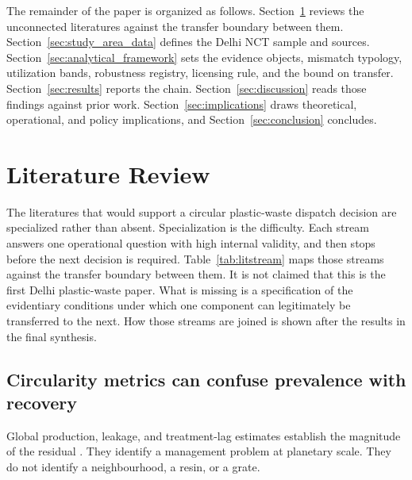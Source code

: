 \documentclass[12pt,a4paper]{article}
\begin{document}
The remainder of the paper is organized as follows. Section~\ref{sec:literature} reviews the unconnected literatures against the transfer boundary between them. Section~\ref{sec:study_area_data} defines the Delhi NCT sample and sources. Section~\ref{sec:analytical_framework} sets the evidence objects, mismatch typology, utilization bands, robustness registry, licensing rule, and the bound on transfer. Section~\ref{sec:results} reports the chain. Section~\ref{sec:discussion} reads those findings against prior work. Section~\ref{sec:implications} draws theoretical, operational, and policy implications, and Section~\ref{sec:conclusion} concludes.

\section{Literature Review}
\label{sec:literature}

The literatures that would support a circular plastic-waste dispatch decision are specialized rather than absent. Specialization is the difficulty. Each stream answers one operational question with high internal validity, and then stops before the next decision is required. Table~\ref{tab:litstream} maps those streams against the transfer boundary between them. It is not claimed that this is the first Delhi plastic-waste paper. What is missing is a specification of the evidentiary conditions under which one component can legitimately be transferred to the next. How those streams are joined is shown after the results in the final synthesis.

\subsection{Circularity metrics can confuse prevalence with recovery}

Global production, leakage, and treatment-lag estimates establish the magnitude of the residual \citep{geyer_plastic_2017,jambeck_plastic_2015,worldbank_whatawaste2_2018,worldbank_whatawaste3_2025}. They identify a management problem at planetary scale. They do not identify a neighbourhood, a resin, or a grate.
\end{document}
